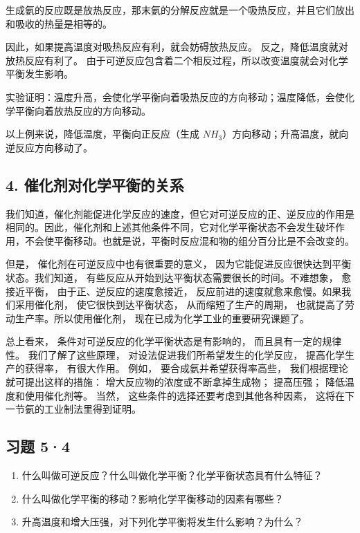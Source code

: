 生成氨的反应既是放热反应，那末氨的分解反应就是一个吸热反应，并且它们放出和吸收的热量是相等的。

因此，如果提高温度对吸热反应有利，就会妨碍放热反应。
反之，降低温度就对放热反应有利了。
由于可逆反应包含着二个相反过程，所以改变温度就会对化学平衡发生影响。

实验证明：温度升高，会使化学平衡向着吸热反应的方向移动；温度降低，会使化学平衡向着放热反应的方向移动。

以上例来说，降低温度，平衡向正反应（生成
\(NH_{3}\)）方向移动；升高温度，就向逆反应方向移动了。

\subsection{4. 催化剂对化学平衡的关系}

我们知道，催化剂能促进化学反应的速度，但它对可逆反应的正、逆反应的作用是相同的。因此，催化剂和上述其他条件不同，它对化学平衡状态不会发生破坏作用，不会使平衡移动。也就是说，平衡时反应混和物的组分百分比是不会改变的。

但是， 催化剂在可逆反应中也有很重要的意义，
因为它能促进反应很快达到平衡状态。我们知道，
有些反应从开始到达平衡状态需要很长的时间。不难想象， 愈接近平衡，
由于正、逆反应的速度愈接近，
反应前进的速度就愈来愈慢。如果我们采用催化剂， 使它很快到达平衡状态，
从而缩短了生产的周期， 也就提高了劳动生产率。所以使用催化剂，
现在已成为化学工业的重要研究课题了。

总上看来， 条件对可逆反应的化学平衡状态是有影响的，
而且具有一定的规律性。 我们了解了这些原理，
对设法促进我们所希望发生的化学反应， 提高化学生产的获得率， 有很大作用。
例如， 要合成氨并希望获得率高些， 我们根据理论就可提出这样的措施：
增大反应物的浓度或不断拿掉生成物； 提高压强； 降低温度和使用催化剂等。
当然， 这些条件的选择还要考虑到其他各种因素，
这将在下一节氨的工业制法里得到证明。

\subsection{习题 5·4}

\begin{enumerate}
\item
  什么叫做可逆反应？什么叫做化学平衡？化学平衡状态具有什么特征？
\item
  什么叫做化学平衡的移动？影响化学平衡移动的因素有哪些？
\item
  升高温度和增大压强，对下列化学平衡将发生什么影响？为什么？
\end{enumerate}

